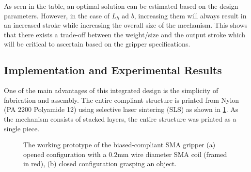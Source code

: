As seen in the table, an optimal solution can be estimated based on the design parameters. However, in the case of $L_h$ ad $b$, increasing them will always result in an increased stroke while increasing the overall size of the mechanism. This shows that there exists a trade-off between the weight/size and the output stroke which will be critical to ascertain based on the gripper specifications.

\subsection{Implementation and Experimental Results}
One of the main advantages of this integrated design is the simplicity of fabrication and assembly. The entire compliant structure is printed from Nylon (PA 2200 Polyamide 12) using selective laser sintering (SLS) as shown in \cref{fig:mandrel-finalproto}. As the mechanism consists of stacked layers, the entire structure was printed as a single piece.
\begin{figure}[hbt!]
    \centering
    \resizebox{\textwidth}{!}{}
    \caption{The working prototype of the biased-compliant SMA gripper (a) opened configuration with a $0.2$mm wire diameter SMA coil (framed in red), (b) closed configuration grasping an object.}
    \label{fig:mandrel-finalproto}
\end{figure}

